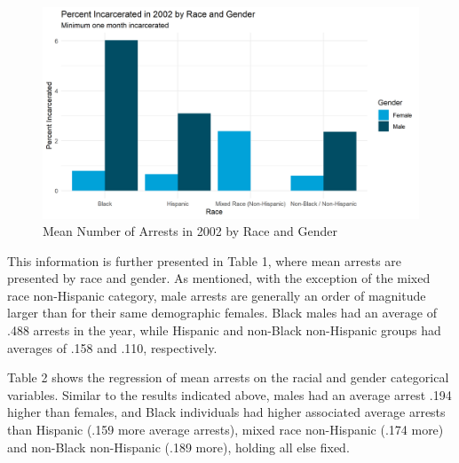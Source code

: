 \documentclass{article}
\begin{document}
\begin{figure}[H]
    \begin{center}
        \includegraphics[width=.85\textwidth]{incarcerationpct_by_racegender}
    \end{center}
    \caption{Mean Number of Arrests in 2002 by Race and Gender}
    \label{fig:graph}
\end{figure}

This information is further presented in Table 1, where mean arrests are presented by race and gender. As mentioned, with the exception of the mixed race non-Hispanic category, male arrests are generally an order of magnitude larger than for their same demographic females. Black males had an average of .488 arrests in the year, while Hispanic and non-Black non-Hispanic groups had averages of .158 and .110, respectively. 



Table 2 shows the regression of mean arrests on the racial and gender categorical variables. Similar to the results indicated above, males had an average arrest .194 higher than females, and Black individuals had higher associated average arrests than Hispanic (.159 more average arrests), mixed race non-Hispanic (.174 more) and non-Black non-Hispanic (.189 more), holding all else fixed. 
 

\end{document}
